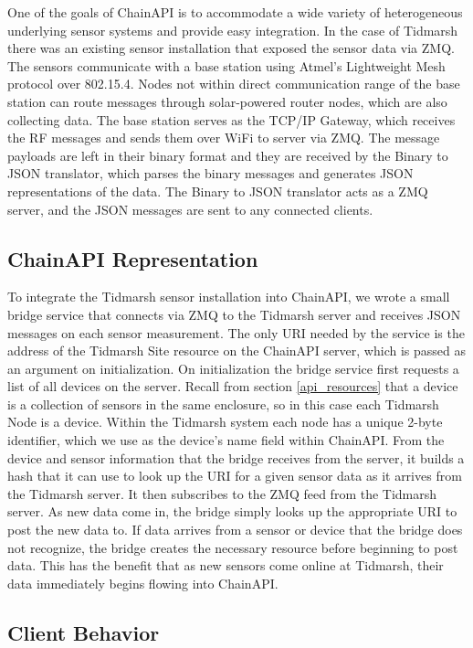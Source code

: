 \documentclass{acm_proc_article-sp}
\begin{document}
One of the goals of ChainAPI is to accommodate a wide variety of heterogeneous
underlying sensor systems and provide easy integration. In the case of Tidmarsh
there was an existing sensor installation that exposed the sensor data via ZMQ.
The sensors communicate with a base station using Atmel's Lightweight Mesh
protocol over 802.15.4. Nodes not within direct communication range of the base
station can route messages through solar-powered router nodes, which are also
collecting data. The base station serves as the TCP/IP Gateway, which receives
the RF messages and sends them over WiFi to server via ZMQ. The message
payloads are left in their binary format and they are received by the Binary to
JSON translator, which parses the binary messages and generates JSON
representations of the data. The Binary to JSON translator acts as a ZMQ
server, and the JSON messages are sent to any connected clients.

\subsection{ChainAPI Representation}

To integrate the Tidmarsh sensor installation into ChainAPI, we wrote a small
bridge service that connects via ZMQ to the Tidmarsh server and receives JSON
messages on each sensor measurement. The only URI needed by the service
is the address of the Tidmarsh Site resource on the ChainAPI server, which is
passed as an argument on initialization. On initialization the bridge service
first requests a list of all devices on the server. Recall from section
\ref{api_resources} that a device is a collection of sensors in the same
enclosure, so in this case each Tidmarsh Node is a device. Within the Tidmarsh
system each node has a unique 2-byte identifier, which we use as the device's
name field within ChainAPI. From the device and sensor information that the
bridge receives from the server, it builds a hash that it can use to look up
the URI for a given sensor data as it arrives from the Tidmarsh server. It then
subscribes to the ZMQ feed from the Tidmarsh server. As new data come in, the
bridge simply looks up the appropriate URI to post the new data to. If data
arrives from a sensor or device that the bridge does not recognize, the bridge
creates the necessary resource before beginning to post data. This has the
benefit that as new sensors come online at Tidmarsh, their data immediately
begins flowing into ChainAPI.

\subsection{Client Behavior}
\end{document}
